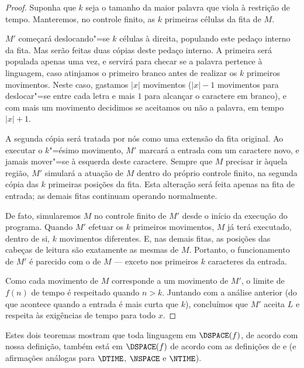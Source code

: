 \begin{proof}
    Suponha que $k$ seja o tamanho da maior palavra
    que viola à restrição de tempo.
    Manteremos, no controle finito,
    as $k$ primeiras células da fita de $M$.

    $M'$ começará deslocando"=se $k$ células à direita,
    populando este pedaço interno da fita.
    Mas serão feitas duas cópias deste pedaço interno.
    A primeira será populada apenas uma vez,
    e servirá para checar se a palavra
    pertence à linguagem,
    caso atinjamos o primeiro branco
    antes de realizar os $k$ primeiros movimentos.
    Neste caso, gastamos $|x|$ movimentos
    ($|x| - 1$ movimentos para deslocar"=se entre cada letra
    e mais $1$ para alcançar o caractere em branco),
    e com mais um movimento
    decidimos se aceitamos ou não a palavra,
    em tempo $|x| + 1$.

    A segunda cópia será tratada por nós
    como uma extensão da fita original.
    Ao executar o $k$"=ésimo movimento,
    $M'$ marcará a entrada com um caractere novo,
    e jamais mover"=se à esquerda deste caractere.
    Sempre que $M$ precisar ir àquela região,
    $M'$ simulará a atuação de $M$
    dentro do próprio controle finito,
    na segunda cópia das $k$ primeiras posições da fita.
    Esta alteração será feita apenas na fita de entrada;
    as demais fitas continuam operando normalmente.

    De fato, simularemos $M$ no controle finito de $M'$
    desde o início da execução do programa.
    Quando $M'$ efetuar os $k$ primeiros movimentos,
    $M$ já terá executado, dentro de si,
    $k$ movimentos diferentes.
    E, nas demais fitas, as posições das cabeças de leitura
    são exatamente as mesmas de $M$.
    Portanto,
    o funcionamento de $M'$
    é parecido com o de $M$
    --- exceto nos primeiros $k$ caracteres da entrada.

    Como cada movimento de $M$ corresponde a um movimento de $M'$,
    o limite de $f(n)$ de tempo é respeitado
    quando $n > k$.
    Juntando com a análise anterior
    (do que acontece quando a entrada é mais curta que $k$),
    concluímos que $M'$ aceita $L$ e respeita às exigências de tempo
    para todo $x$.
\end{proof}

Estes dois teoremas mostram que
toda linguagem em $\DSPACE(f)$,
de acordo com nossa definição,
também está em $\DSPACE(f)$
de acordo com as definições de 
e 
(e afirmações análogas para $\DTIME$, $\NSPACE$ e $\NTIME$).

